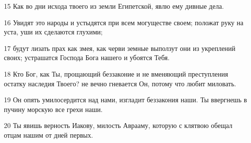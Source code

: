\par 15 Как во дни исхода твоего из земли Египетской, явлю ему дивные дела.
\par 16 Увидят это народы и устыдятся при всем могуществе своем; положат руку на уста, уши их сделаются глухими;
\par 17 будут лизать прах как змея, как черви земные выползут они из укреплений своих; устрашатся Господа Бога нашего и убоятся Тебя.
\par 18 Кто Бог, как Ты, прощающий беззаконие и не вменяющий преступления остатку наследия Твоего? не вечно гневается Он, потому что любит миловать.
\par 19 Он опять умилосердится над нами, изгладит беззакония наши. Ты ввергнешь в пучину морскую все грехи наши.
\par 20 Ты явишь верность Иакову, милость Аврааму, которую с клятвою обещал отцам нашим от дней первых.


